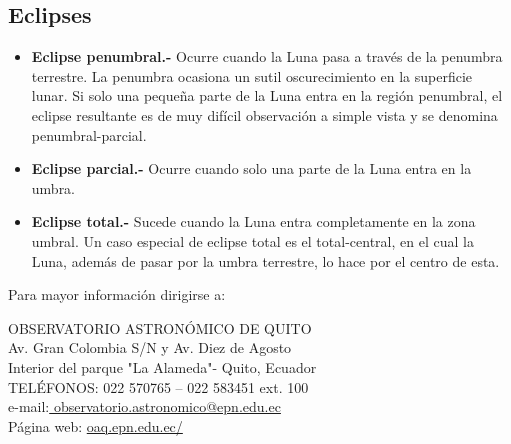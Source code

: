 \documentclass[12pt,a4paper,oneside]{article}
\begin{document}
\subsection{Eclipses}
\begin{itemize}
\item \textbf{ Eclipse penumbral.-} Ocurre cuando la Luna pasa a través de la penumbra terrestre. La penumbra ocasiona un sutil oscurecimiento en la superficie lunar. Si solo una pequeña parte de la Luna entra en la región penumbral, el eclipse resultante es de muy difícil observación a simple vista y se denomina penumbral-parcial.
\item \textbf{Eclipse parcial.-} Ocurre cuando solo una parte de la Luna entra en la umbra.
\item \textbf{ Eclipse total.-} Sucede cuando la Luna entra completamente en la zona umbral. Un caso especial de eclipse total es el total-central, en el cual la Luna, además de pasar por la umbra terrestre, lo hace por el centro de esta.
\end{itemize}
\vspace{3cm}
Para mayor información dirigirse a: \\
\begin{center}
OBSERVATORIO ASTRONÓMICO DE QUITO\\
\footnotesize Av. Gran Colombia S/N y Av. Diez de Agosto\\
\footnotesize Interior del parque "La Alameda"- Quito, Ecuador \\

\footnotesize TELÉFONOS: 022 570765 – 022 583451 ext. 100\\



\footnotesize e-mail:\url{ observatorio.astronomico@epn.edu.ec}\\
\footnotesize Página web: \url{oaq.epn.edu.ec/}
\end{center}
\end{document}
